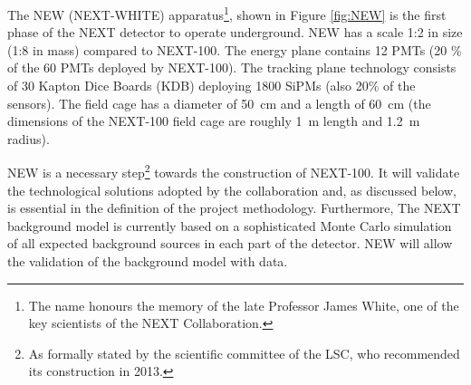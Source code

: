 \documentclass[a4paper,11pt,oneside]{article}
\begin{document}
The NEW (NEXT-WHITE) apparatus\footnote{The name honours the memory of the late Professor James White, one of the key scientists of the NEXT Collaboration.}, shown in Figure \ref{fig:NEW} is the first phase of the NEXT detector to operate underground. NEW 
%
%
has a scale 1:2 in size (1:8 in mass) compared to NEXT-100. The energy plane contains 12 PMTs (20 \% of the 60 PMTs deployed by NEXT-100). The tracking plane technology consists of 30 Kapton Dice Boards (KDB) deploying 1800 SiPMs (also 20\% of the sensors). The field cage has a diameter of 50~cm and a length of 60~cm (the dimensions of the NEXT-100 field cage are roughly 1~m length and 1.2~m radius). 

NEW is a necessary step\footnote{As formally stated by the scientific committee of the LSC, who recommended its construction in 2013.} towards the construction of NEXT-100. It will validate the technological solutions adopted by the collaboration and, as discussed below, is essential in the definition of the project methodology. Furthermore, The NEXT background model is currently based on a sophisticated Monte Carlo simulation of all expected background sources in each part of the detector. NEW will allow the validation of the background model with data. 

%
\end{document}
